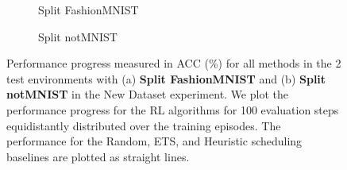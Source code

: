\begin{figure}[t]
	\centering
	\setlength{\figwidth}{0.26\textwidth}
	\setlength{\figheight}{.14\textheight}
	\begin{subfigure}[t]{0.48\textwidth}
		\centering
		
		\vspace{-4mm} %
		\caption{Split FashionMNIST}
		\label{fig:rewards_fashionmnist_2envs}
	\end{subfigure}%
	\begin{subfigure}[t]{0.48\textwidth}
		\centering
		
		\caption{Split notMNIST}
		\label{fig:rewards_notmnist_2envs}
	\end{subfigure}
	\vspace{-1mm}
	\caption{Performance progress measured in ACC (\%) for all methods in the 2 test environments with (a) {\bf Split FashionMNIST} and (b) {\bf Split notMNIST} in the New Dataset experiment. We plot the performance progress for the RL algorithms for 100 evaluation steps equidistantly distributed over the training episodes. The performance for the Random, ETS, and Heuristic scheduling baselines are plotted as straight lines.  }
	\label{fig:rewards_new_dataset_2envs}
	\vspace{-2mm}
\end{figure}




